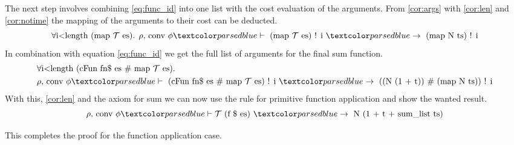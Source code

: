 The next step involves combining \ref{eq:func_id} into one list with the cost evaluation of the arguments.
From \ref{cor:args} with \ref{cor:len} and \ref{cor:notime} the mapping of the arguments to their cost can be deducted.
\begin{equation*}
  \forall \text{i<length (map } \mathcal{T}\text{ es). }\rho\text{, conv }\phi \hvdash\text{ (map }\mathcal{T}\text{ es) ! i }\hrightarrow \text{ (map N ts) ! i}
\end{equation*}
In combination with equation \ref{eq:func_id} we get the full list of arguments for the final sum function.
\begin{equation*}
  \begin{aligned}
  &\forall \text{i<length (cFun fn\$ es \# map } \mathcal{T}\text{ es). } \\
  &\rho\text{, conv }\phi \hvdash\text{ (cFun fn\$ es \# map }\mathcal{T}\text{ es) ! i }\hrightarrow \text{ ((N (1 + t)) \# (map N ts)) ! i}
  \end{aligned}
\end{equation*}
With this, \ref{cor:len} and the axiom for sum we can now use the rule for primitive function application and show the wanted result.
\begin{equation*}
  \rho \text{, conv } \phi \hvdash \mathcal{T}\text{ (f \$ es) }\hrightarrow\text{ N (1 + t + sum\_list ts)}
\end{equation*}

This completes the proof for the function application case.
